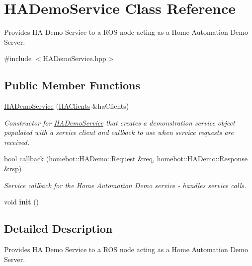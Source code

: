 \hypertarget{classHADemoService}{\section{H\-A\-Demo\-Service Class Reference}
\label{classHADemoService}
}


Provides H\-A Demo Service to a R\-O\-S node acting as a Home Automation Demo Server.  




{\ttfamily \#include $<$H\-A\-Demo\-Service.\-hpp$>$}

\subsection*{Public Member Functions}
\begin{DoxyCompactItemize}
\item 
\hyperlink{classHADemoService_ab811f36a7568e3db91376b9c020aa479}{H\-A\-Demo\-Service} (\hyperlink{classHAClients}{H\-A\-Clients} \&ha\-Clients)
\begin{DoxyCompactList}\small\item\em Constructor for \hyperlink{classHADemoService}{H\-A\-Demo\-Service} that creates a demonstration service object populated with a service client and callback to use when service requests are received. \end{DoxyCompactList}\item 
bool \hyperlink{classHADemoService_ab774121c439c8787271da8184a11abf3}{callback} (homebot\-::\-H\-A\-Demo\-::\-Request \&req, homebot\-::\-H\-A\-Demo\-::\-Response \&rsp)
\begin{DoxyCompactList}\small\item\em Service callback for the Home Automation Demo service -\/ handles service calls. \end{DoxyCompactList}\item 
\hypertarget{classHADemoService_ab5ed73d4c2557de8f43c5aefdd5a2796}{void {\bfseries init} ()}\label{classHADemoService_ab5ed73d4c2557de8f43c5aefdd5a2796}

\end{DoxyCompactItemize}


\subsection{Detailed Description}
Provides H\-A Demo Service to a R\-O\-S node acting as a Home Automation Demo Server. 

